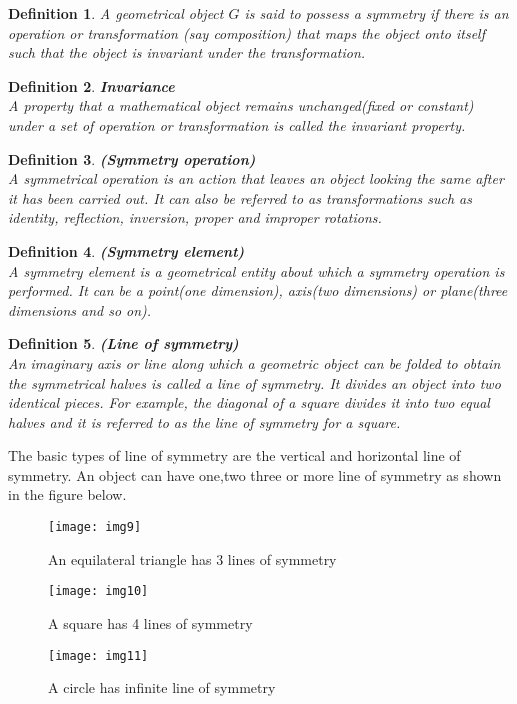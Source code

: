 \documentclass[a4paper, 12pt, openany]{report}
\newtheorem{defn}{Definition}[section]
\begin{document}
	\begin{defn} A geometrical object $G$ is said to possess a symmetry if there is an operation or transformation (say composition) that maps the \break object onto itself such that the object is invariant under the transformation.\end{defn}
	\begin{defn}\textbf{Invariance}\\
		A property that a mathematical object remains unchanged(fixed or constant) under a set of operation or transformation is called the invariant property.	\end{defn}
	\begin{defn}\textbf{(Symmetry operation)}\\
		 A symmetrical operation is an action that leaves an object looking the same after it has been carried out. It can also be referred to as transformations such as identity, reflection, inversion, proper and improper rotations.\end{defn}
	\begin{defn}\textbf{(Symmetry element)}\\
		 A symmetry element is a geometrical entity about which a symmetry  operation is performed. It can be a point(one dimension), axis(two  dimensions) or plane(three dimensions and so on).\end{defn}
	\begin{defn}\textbf{(Line of symmetry)}\\
		An imaginary axis or line along which a geometric object can be folded to obtain the symmetrical halves is called a line of symmetry. It divides an object into two identical pieces. For example, the diagonal of a square divides it into two equal halves and it is referred to as the line of symmetry for a square.\end{defn} The basic types of line of symmetry are the vertical and horizontal line of symmetry. An object can have one,two three or more line of symmetry as shown in the figure below.
	
		  	\begin{figure}\centering\texttt{[image: img9]}
			\caption{An equilateral triangle has 3 lines of symmetry}
		\end{figure}
		
\begin{figure}\centering\texttt{[image: img10]}  	\caption{A square has 4 lines of symmetry}
\end{figure}
	\begin{figure} \centering\texttt{[image: img11]} \caption{A circle has  infinite line of symmetry}
\end{figure}
	
\end{document}
